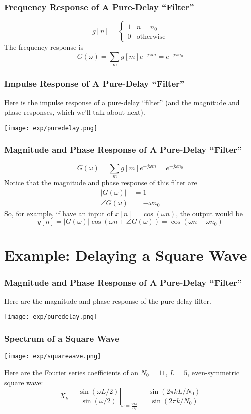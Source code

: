 \documentclass{beamer}
\begin{document}
\begin{frame}
  \frametitle{Frequency Response of A Pure-Delay ``Filter''}

  \[
  g[n]=\begin{cases}
  1 & n=n_0\\
  0 & \mbox{otherwise}
  \end{cases}
  \]
  The frequency response is
  \[
  G(\omega)=\sum_m g[m]e^{-j\omega m} = e^{-j\omega n_0}
  \]
  
\end{frame}

\begin{frame}
  \frametitle{Impulse Response of A Pure-Delay ``Filter''}
  Here is the impulse response of a pure-delay ``filter'' (and the magnitude and
  phase responses, which we'll talk about next).
\centerline{\texttt{[image: exp/puredelay.png]}}
\end{frame}

\begin{frame}
  \frametitle{Magnitude and Phase Response of A Pure-Delay ``Filter''}

  \[
  G(\omega)=\sum_m g[m]e^{-j\omega m} = e^{-j\omega n_0}
  \]
  Notice that the magnitude and phase response of this filter are
  \begin{align*}
    |G(\omega)| &= 1\\
    \angle G(\omega) &= -\omega n_0
  \end{align*}
  So, for example, if have an input of $x[n]=\cos(\omega n)$, the
  output would be
  \[
  y[n]=|G(\omega)|\cos\left(\omega n+\angle G(\omega)\right)
  = \cos\left(\omega n-\omega n_0\right)
  \]
\end{frame}


\section[Example]{Example: Delaying a Square Wave}
\setcounter{subsection}{1}

\begin{frame}
  \frametitle{Magnitude and Phase Response of A Pure-Delay ``Filter''}
  Here are the magnitude and phase response of the pure delay filter.
\centerline{\texttt{[image: exp/puredelay.png]}}
\end{frame}

\begin{frame}
  \frametitle{Spectrum of a Square Wave}

  \centerline{\texttt{[image: exp/squarewave.png]}}

  Here are the Fourier series coefficients of an $N_0=11$,
  $L=5$, even-symmetric square wave:
  \[
  X_k =\left.\frac{\sin(\omega L/2)}{\sin(\omega/2)}\right|_{\omega=\frac{2\pi k}{N_0}}
  =\frac{\sin(2\pi kL/N_0)}{\sin(2\pi k/N_0)}
  \]
\end{frame}
\end{document}
